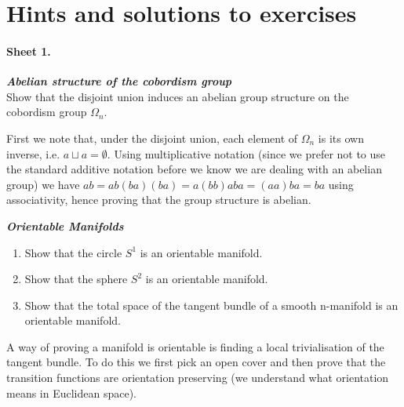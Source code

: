 \part{Hints and solutions to exercises}



\subsection*{Sheet 1.}

\begin{exercise} \textbf{\textit{Abelian structure of the cobordism group}}\\
Show that the disjoint union induces an abelian group structure on the cobordism group \(\Omega_n\).
\end{exercise}

\noindent First we note that, under the disjoint union, each element of $\Omega_n$ is its own inverse, i.e. $a\sqcup a=\emptyset$. Using multiplicative notation (since we prefer not to use the standard additive notation before we know we are dealing with an abelian group) we have $ab=ab(ba)(ba)=a(bb)aba=(aa)ba=ba$ using associativity, hence proving that the group structure is abelian.

\hspace{1cm}

\begin{exercise} \textbf{\textit{Orientable Manifolds}}
\begin{enumerate}[label=(\alph*)]
    \item Show that the circle $S^1$ is an orientable manifold. 
    \item Show that the sphere $S^2$ is an orientable manifold. 
    \item Show that the total space of the tangent bundle of a smooth n-manifold is an orientable
manifold. 
\end{enumerate}
\end{exercise}

\noindent A way of proving a manifold is orientable is finding a local trivialisation of the tangent bundle. To do this we first pick an open cover and then prove that the transition functions are orientation preserving (we understand what orientation means in Euclidean space). 


